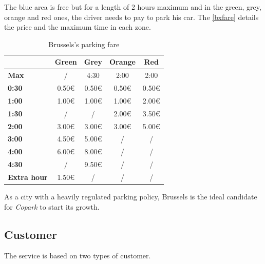 \documentclass[12pt,a4paper,oneside]{book}
\newcommand{\bp}{\textit{Copark}}
\begin{document}
The blue area is free but for a length of 2 hours maximum and in the green, grey, orange and red ones, the driver needs to pay to park his car. The \autoref{bxfare} details the price and the maximum time in each zone.\\

\begin{table}[h]
\centering
\caption{Brussels's parking fare}
\label{bxfare}
\begin{tabular}{@{}lcccc@{}}
\cmidrule(l){2-5}
\textbf{}                                 & \textbf{Green} & \textbf{Grey} & \textbf{Orange} & \textbf{Red} \\ \midrule
\multicolumn{1}{l}{\textbf{Max}}        & /              & 4:30          & 2:00            & 2:00         \\ \midrule
\multicolumn{1}{l}{\textbf{0:30}}       & 0.50\euro{}           & 0.50\euro{}          & 0.50\euro{}            & 0.50\euro{}         \\ \midrule
\multicolumn{1}{l}{\textbf{1:00}}       & 1.00\euro{}           & 1.00\euro{}          & 1.00\euro{}            & 2.00\euro{}         \\ \midrule
\multicolumn{1}{l}{\textbf{1:30}}       & /              & /             & 2.00\euro{}            & 3.50\euro{}         \\ \midrule
\multicolumn{1}{l}{\textbf{2:00}}       & 3.00\euro{}           & 3.00\euro{}          & 3.00\euro{}            & 5.00\euro{}         \\ \midrule
\multicolumn{1}{l}{\textbf{3:00}}       & 4.50\euro{}           & 5.00\euro{}          & /               & /            \\ \midrule
\multicolumn{1}{l}{\textbf{4:00}}       & 6.00\euro{}           & 8.00\euro{}          & /               & /            \\ \midrule
\multicolumn{1}{l}{\textbf{4:30}}       & /              & 9.50\euro{}          & /               & /            \\ \midrule
\multicolumn{1}{l}{\textbf{Extra hour}} & 1.50\euro{}           & /             & /               & /            \\ \bottomrule
\end{tabular}
\end{table}

As a city with a heavily regulated parking policy, Brussels is the ideal candidate for \bp{} to start its growth.

\subsection{Customer}
The service is based on two types of customer.\\
\end{document}
